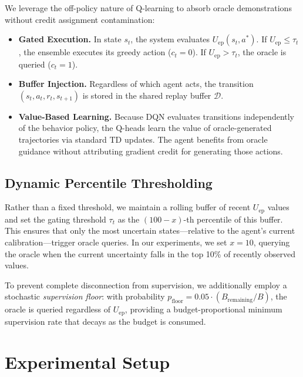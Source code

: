 \documentclass[11pt, a4paper]{article}
\begin{document}
We leverage the off-policy nature of Q-learning to absorb oracle demonstrations without credit assignment contamination:
\begin{itemize}[leftmargin=*]
    \item \textbf{Gated Execution.} In state $s_t$, the system evaluates $U_{\mathrm{ep}}(s_t, a^*)$. If $U_{\mathrm{ep}} \leq \tau_t$, the ensemble executes its greedy action ($c_t = 0$). If $U_{\mathrm{ep}} > \tau_t$, the oracle is queried ($c_t = 1$).
    \item \textbf{Buffer Injection.} Regardless of which agent acts, the transition $(s_t, a_t, r_t, s_{t+1})$ is stored in the shared replay buffer $\mathcal{D}$.
    \item \textbf{Value-Based Learning.} Because DQN evaluates transitions independently of the behavior policy, the Q-heads learn the value of oracle-generated trajectories via standard TD updates. The agent benefits from oracle guidance without attributing gradient credit for generating those actions.
\end{itemize}

\subsection{Dynamic Percentile Thresholding}

Rather than a fixed threshold, we maintain a rolling buffer of recent $U_{\mathrm{ep}}$ values and set the gating threshold $\tau_t$ as the $(100 - x)$-th percentile of this buffer. This ensures that only the most uncertain states---relative to the agent's current calibration---trigger oracle queries. In our experiments, we set $x = 10$, querying the oracle when the current uncertainty falls in the top 10\% of recently observed values.

To prevent complete disconnection from supervision, we additionally employ a stochastic \textit{supervision floor}: with probability $p_{\mathrm{floor}} = 0.05 \cdot (B_{\mathrm{remaining}} / B)$, the oracle is queried regardless of $U_{\mathrm{ep}}$, providing a budget-proportional minimum supervision rate that decays as the budget is consumed.


\section{Experimental Setup}
\label{sec:setup}
\end{document}
